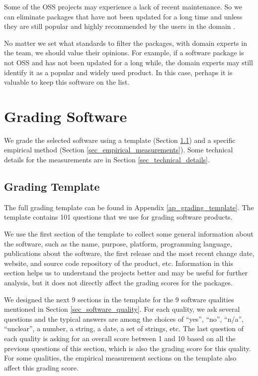 Some of the OSS projects may experience a lack of recent maintenance. So we can eliminate packages that have not been updated for a long time and unless they are still popular and highly recommended by the users in the domain \cite{SmithEtAl2021}.

No matter we set what standards to filter the packages, with domain experts in the team, we should value their opinions. For example, if a software package is not OSS and has not been updated for a long while, the domain experts may still identify it as a popular and widely used product. In this case, perhaps it is valuable to keep this software on the list.

\section{Grading Software}
\label{sec_grading_software}

We grade the selected software using a template (Section \ref{sec_grading_template}) and a specific empirical method (Section \ref{sec_empirical_measurements}). Some technical details for the measurements are in Section \ref{sec_technical_details}.

\subsection{Grading Template}
\label{sec_grading_template}
The full grading template can be found in Appendix \ref{ap_grading_template}. The template contains 101 questions that we use for grading software products.

We use the first section of the template to collect some general information about the software, such as the name, purpose, platform, programming language, publications about the software, the first release and the most recent change date, website, and source code repository of the product, etc. Information in this section helps us to understand the projects better and may be useful for further analysis, but it does not directly affect the grading scores for the packages.

We designed the next 9 sections in the template for the 9 software qualities mentioned in Section \ref{sec_software_quality}. For each quality, we ask several questions and the typical answers are among the choices of ``yes'', ``no'', ``n/a'', ``unclear'', a number, a string, a date, a set of strings, etc. The last question of each quality is asking for an overall score between 1 and 10 based on all the previous questions of this section, which is also the grading score for this quality. For some qualities, the empirical measurement sections on the template also affect this grading score.

